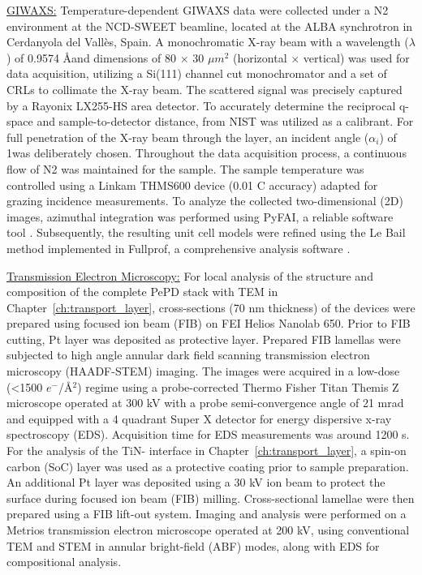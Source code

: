 \underline{GIWAXS:} Temperature-dependent GIWAXS data were collected under a N2 environment at the NCD-SWEET beamline, located at the ALBA synchrotron in Cerdanyola del Vallès, Spain. A monochromatic X-ray beam with a wavelength ($\lambda$) of 0.9574 \AA and dimensions of 80 × 30 $\mu m^2$ (horizontal $\times$ vertical) was used for data acquisition, utilizing a Si(111) channel cut monochromator and a set of CRLs to collimate the X-ray beam. The scattered signal was precisely captured by a Rayonix LX255-HS area detector. To accurately determine the reciprocal q-space and sample-to-detector distance,  from NIST was utilized as a calibrant. For full penetration of the X-ray beam through the layer, an incident angle ($\alpha_i$) of 1\degree was deliberately chosen. Throughout the data acquisition process, a continuous flow of N2 was maintained for the sample. The sample temperature was controlled using a Linkam THMS600 device (0.01 \degree C accuracy) adapted for grazing incidence measurements. To analyze the collected two-dimensional (2D) images, azimuthal integration was performed using PyFAI, a reliable software tool \cite{Ashiotis2015ThePyFAI}. Subsequently, the resulting unit cell models were refined using the Le Bail method implemented in Fullprof, a comprehensive analysis software \cite{Rodriguez-Carvajal1993RecentDiffraction}.

\underline{Transmission Electron Microscopy:} For local analysis of the structure and composition of the complete PePD stack with TEM in Chapter~\ref{ch:transport_layer}, cross-sections (70 nm thickness) of the devices were prepared using focused ion beam (FIB) on FEI Helios Nanolab 650. Prior to FIB cutting, Pt layer was deposited as protective layer. Prepared FIB lamellas were subjected to high angle annular dark field scanning transmission electron microscopy (HAADF-STEM) imaging. The images were acquired in a low-dose (<1500 $e^-$/\AA$^2$) regime using a probe-corrected Thermo Fisher Titan Themis Z microscope operated at 300 kV with a probe semi-convergence angle of 21 mrad and equipped with a 4 quadrant Super X detector for energy dispersive x-ray spectroscopy (EDS). Acquisition time for EDS measurements was around 1200 s. For the analysis of the TiN- interface in Chapter~\ref{ch:transport_layer}, a spin-on carbon (SoC) layer was used as a protective coating prior to sample preparation. An additional Pt layer was deposited using a 30 kV ion beam to protect the surface during focused ion beam (FIB) milling. Cross-sectional lamellae were then prepared using a FIB lift-out system. Imaging and analysis were performed on a Metrios transmission electron microscope operated at 200 kV, using conventional TEM and STEM in annular bright-field (ABF) modes, along with EDS for compositional analysis.

